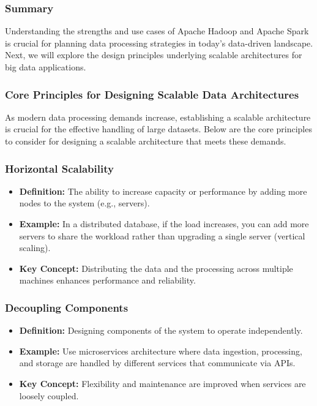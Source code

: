\documentclass[aspectratio=169]{beamer}
\begin{document}
\begin{frame}
  \frametitle{Summary}
  Understanding the strengths and use cases of Apache Hadoop and Apache Spark is crucial for planning data processing strategies in today's data-driven landscape. 
  Next, we will explore the design principles underlying scalable architectures for big data applications.
\end{frame}

\begin{frame}[fragile]
    \frametitle{Core Principles for Designing Scalable Data Architectures}
    As modern data processing demands increase, establishing a scalable architecture is crucial for the effective handling of large datasets. Below are the core principles to consider for designing a scalable architecture that meets these demands.
\end{frame}

\begin{frame}[fragile]
    \frametitle{Horizontal Scalability}
    \begin{itemize}
        \item \textbf{Definition:} The ability to increase capacity or performance by adding more nodes to the system (e.g., servers).
        \item \textbf{Example:} In a distributed database, if the load increases, you can add more servers to share the workload rather than upgrading a single server (vertical scaling).
        \item \textbf{Key Concept:} Distributing the data and the processing across multiple machines enhances performance and reliability.
    \end{itemize}
\end{frame}

\begin{frame}[fragile]
    \frametitle{Decoupling Components}
    \begin{itemize}
        \item \textbf{Definition:} Designing components of the system to operate independently.
        \item \textbf{Example:} Use microservices architecture where data ingestion, processing, and storage are handled by different services that communicate via APIs.
        \item \textbf{Key Concept:} Flexibility and maintenance are improved when services are loosely coupled.
    \end{itemize}
\end{frame}
\end{document}
